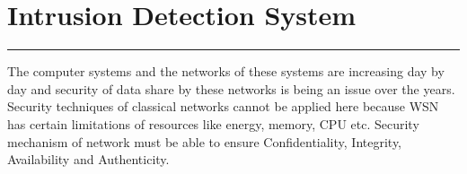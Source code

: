 \chapter{Intrusion Detection System}
\label{C3} %
\graphicspath{{Figures/PDF/}{Figures/PNG/}}

\noindent\rule{\linewidth}{2pt}
\noindent
The computer systems and the networks of these systems are increasing day by day and security of data share by these networks is being an issue over the years. Security techniques of classical networks cannot be applied here because WSN has certain limitations of resources like energy, memory, CPU etc. Security mechanism of network must be able to ensure Confidentiality, Integrity, Availability and Authenticity.
